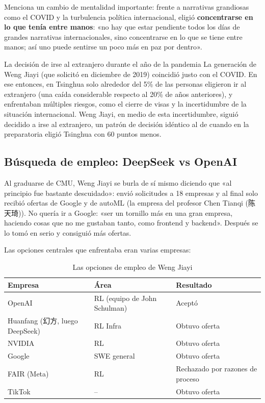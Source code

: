 \documentclass[a4paper]{article}
\begin{document}
Menciona un cambio de mentalidad importante: frente a narrativas grandiosas como el COVID y la turbulencia política internacional, eligió \textbf{concentrarse en lo que tenía entre manos}: «no hay que estar pendiente todos los días de grandes narrativas internacionales, sino concentrarse en lo que se tiene entre manos; así uno puede sentirse un poco más en paz por dentro».

\begin{knowledgebox}{La decisión de irse al extranjero durante el año de la pandemia}
La generación de Weng Jiayi (que solicitó en diciembre de 2019) coincidió justo con el COVID. En ese entonces, en Tsinghua solo alrededor del 5\% de las personas eligieron ir al extranjero (una caída considerable respecto al 20\% de años anteriores), y enfrentaban múltiples riesgos, como el cierre de visas y la incertidumbre de la situación internacional. Weng Jiayi, en medio de esta incertidumbre, siguió decidido a irse al extranjero, un patrón de decisión idéntico al de cuando en la preparatoria eligió Tsinghua con 60 puntos menos.
\end{knowledgebox}

\subsection{Búsqueda de empleo: DeepSeek vs OpenAI}

Al graduarse de CMU, Weng Jiayi se burla de sí mismo diciendo que «al principio fue bastante descuidado»: envió solicitudes a 18 empresas y al final solo recibió ofertas de Google y de autoML (la empresa del profesor Chen Tianqi (陈天琦)). No quería ir a Google: «ser un tornillo más en una gran empresa, haciendo cosas que no me gustaban tanto, como frontend y backend». Después se lo tomó en serio y consiguió más ofertas.

Las opciones centrales que enfrentaba eran varias empresas:

\begin{table}[H]
\centering
\begin{tabular}{lll}
\toprule
\textbf{Empresa} & \textbf{Área} & \textbf{Resultado} \\
\midrule
OpenAI & RL (equipo de John Schulman) & Aceptó \\
Huanfang (幻方, luego DeepSeek) & RL Infra & Obtuvo oferta \\
NVIDIA & RL & Obtuvo oferta \\
Google & SWE general & Obtuvo oferta \\
FAIR (Meta) & RL & Rechazado por razones de proceso \\
TikTok & -- & Obtuvo oferta \\
\bottomrule
\end{tabular}
\caption{Las opciones de empleo de Weng Jiayi}
\end{table}
\end{document}
